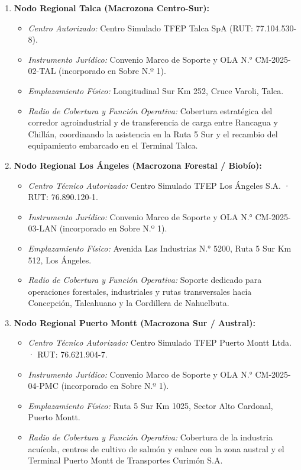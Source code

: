 \begin{enumerate}
  \item \textbf{Nodo Regional Talca (Macrozona Centro-Sur):}
  \begin{itemize}
    \item \textit{Centro Autorizado:} Centro Simulado TFEP Talca SpA (RUT: 77.104.530-8).
    \item \textit{Instrumento Jurídico:} Convenio Marco de Soporte y OLA N.° CM-2025-02-TAL (incorporado en Sobre N.º 1).
    \item \textit{Emplazamiento Físico:} Longitudinal Sur Km 252, Cruce Varoli, Talca.
    \item \textit{Radio de Cobertura y Función Operativa:} Cobertura estratégica del corredor agroindustrial y de transferencia de carga entre Rancagua y Chillán, coordinando la asistencia en la Ruta 5 Sur y el recambio del equipamiento embarcado en el Terminal Talca.
  \end{itemize}

  \item \textbf{Nodo Regional Los Ángeles (Macrozona Forestal / Biobío):}
  \begin{itemize}
    \item \textit{Centro Técnico Autorizado:} Centro Simulado TFEP Los Ángeles S.A. · RUT: 76.890.120-1.
    \item \textit{Instrumento Jurídico:} Convenio Marco de Soporte y OLA N.° CM-2025-03-LAN (incorporado en Sobre N.º 1).
    \item \textit{Emplazamiento Físico:} Avenida Las Industrias N.° 5200, Ruta 5 Sur Km 512, Los Ángeles.
    \item \textit{Radio de Cobertura y Función Operativa:} Soporte dedicado para operaciones forestales, industriales y rutas transversales hacia Concepción, Talcahuano y la Cordillera de Nahuelbuta.
  \end{itemize}

  \item \textbf{Nodo Regional Puerto Montt (Macrozona Sur / Austral):}
  \begin{itemize}
    \item \textit{Centro Técnico Autorizado:} Centro Simulado TFEP Puerto Montt Ltda. · RUT: 76.621.904-7.
    \item \textit{Instrumento Jurídico:} Convenio Marco de Soporte y OLA N.° CM-2025-04-PMC (incorporado en Sobre N.º 1).
    \item \textit{Emplazamiento Físico:} Ruta 5 Sur Km 1025, Sector Alto Cardonal, Puerto Montt.
    \item \textit{Radio de Cobertura y Función Operativa:} Cobertura de la industria acuícola, centros de cultivo de salmón y enlace con la zona austral y el Terminal Puerto Montt de Transportes Curimón S.A.
  \end{itemize}
\end{enumerate}

